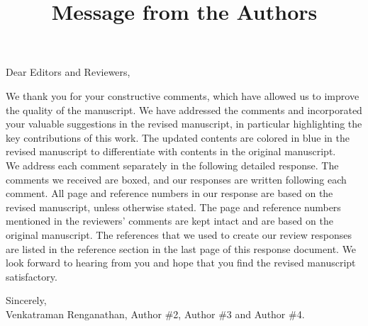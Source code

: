 \title{Message from the Authors}
\vskip 0.2in

\noindent Dear Editors and Reviewers,

\vskip 0.1in

\noindent We thank you for your constructive comments, which have allowed us to improve the quality of the manuscript. We have addressed the comments and incorporated your valuable suggestions in the revised manuscript, in particular highlighting the key contributions of this work. The updated contents are colored in blue in the revised manuscript to differentiate with contents in the original manuscript. \\

\noindent We address each comment separately in the following detailed response. The comments we received are boxed, and our responses are written following each comment. All page and reference numbers in our response are based on the revised manuscript, unless otherwise stated. The page and reference numbers mentioned in the reviewers' comments are kept intact and are based on the original manuscript. The references that we used to create our review responses are listed in the reference section in the last page of this response document. We look forward to hearing from you and hope that you find the revised manuscript satisfactory.
\vskip 0.2in

\noindent Sincerely, \\
\noindent Venkatraman Renganathan, Author \#2, Author \#3 and Author \#4.


